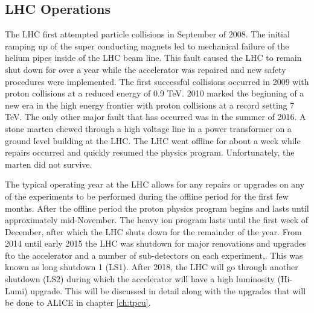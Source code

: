 \subsection{LHC Operations}
The LHC first attempted particle collisions in September of 2008.  The initial ramping up of the super conducting magnets led to mechanical failure of the helium pipes inside of the LHC beam line.  This fault caused the LHC to remain shut down for over a year while the accelerator was repaired and new safety procedures were implemented. The first successful collisions occurred in 2009 with proton collisions at a reduced energy of 0.9 TeV.  2010 marked the beginning of a new era in the high energy frontier with proton collisions at a record setting 7 TeV.  The only other major fault that has occurred was in the summer of 2016. A stone marten chewed through a high voltage line in a power transformer on a ground level building at the LHC.  The LHC went offline for about a week while repairs occurred and quickly resumed the physics program.  Unfortunately, the marten did not survive.

The typical operating year at the LHC allows for any repairs or upgrades on any of the experiments to be performed during the offline period for the first few months.  After the offline period the proton physics program begins and lasts until approximately mid-November.  The heavy ion program lasts until the first week of December, after which the LHC shuts down for the remainder of the year.  From 2014 until early 2015 the LHC was shutdown for major renovations and upgrades fto the accelerator and a number of sub-detectors on each experiment,. This was known as long shutdown 1 (LS1).  After 2018, the LHC will go through another shutdown (LS2) during which the accelerator will have a high luminosity (Hi-Lumi) upgrade.  This will be discussed in detail along with the upgrades that will be done to ALICE in chapter \ref{ch:tpcu}.

